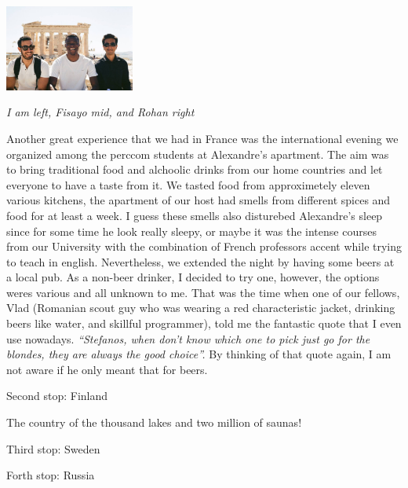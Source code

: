 \documentclass[10pt,a4paper]{article} %
\newcommand{\NewsItem}[1]{ %
\usefont{T1}{fvs}{n}{n} %
\vspace{24pt}\large #1\vspace{3pt} %
\par \normalsize \normalfont}
\begin{document}
\begin{multicols}{3}
\begin{center}
	\includegraphics[width=0.32\textwidth]{media/stef_fisayo_rohan.jpg}
	\par\textit{I am left, Fisayo mid, and Rohan right}
\end{center}


Another great experience that we had in France was the international evening 
we organized among the {\sc perccom} students at Alexandre's apartment. 
The aim was to bring traditional food and alchoolic drinks from our home countries 
and let everyone to have a taste from it. 
We tasted food from approximetely eleven various kitchens, the apartment of our 
host had smells from different spices and food for at least a week. 
I guess these smells also disturebed Alexandre's sleep since for some time he look 
really sleepy, or maybe it was the intense courses from our University with the 
combination of French professors accent while trying to teach in english.  
Nevertheless, we extended the night by having some beers at a local pub. 
As a non-beer drinker, I decided to try one, however, the options weres various 
and all unknown to me. 
That was the time when one of our fellows, Vlad (Romanian scout guy who was wearing a 
red characteristic jacket, drinking beers like water, and skillful programmer), 
told me the fantastic quote that I even use nowadays. 
\textit{``Stefanos, when don't know which one to pick just go for the blondes, 
	they are always the good choice''.} 
By thinking of that quote again, I am not aware if he only meant that for beers.


\NewsItem{Second stop: Finland}
The country of the thousand lakes and two million of saunas!


\NewsItem{Third stop: Sweden}

\NewsItem{Forth stop: Russia}




\end{multicols}
\end{document}

